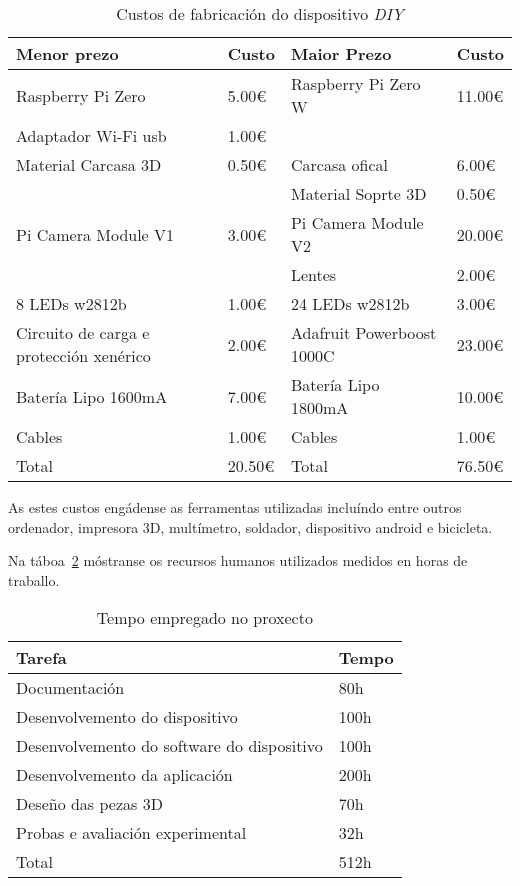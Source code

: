 \begin{table}[tbp]
    \label{tab:custos_dispositivo}
    \caption{Custos de fabricación do dispositivo \emph{DIY}}
    \begin{center}
        \begin{tabular}{|l|l||l|l|}
            \hline
             Menor prezo & Custo  & Maior Prezo & Custo \\ \hline
             Raspberry Pi Zero & 5.00€  & Raspberry Pi Zero W& 11.00€ \\ \hline
             Adaptador Wi-Fi usb & 1.00€ &  & \\ \hline
             Material Carcasa 3D & 0.50€ & Carcasa ofical & 6.00€ \\ \hline
              &  & Material Soprte 3D & 0.50€ \\ \hline
             Pi Camera Module V1 & 3.00€ & Pi Camera Module V2 & 20.00€ \\ \hline
              &  & Lentes  & 2.00€ \\ \hline
             8 LEDs w2812b & 1.00€  &  24 LEDs w2812b & 3.00€\\ \hline
             Circuito de carga e protección xenérico & 2.00€  & Adafruit Powerboost 1000C & 23.00€ \\ \hline
             Batería Lipo 1600mA & 7.00€ & Batería Lipo 1800mA & 10.00€\\ \hline
             Cables & 1.00€ &  Cables & 1.00€ \\ \hline
             Total & 20.50€ &  Total & 76.50€ \\ \hline
        \end{tabular}
    \end{center}
\end{table}

As estes custos engádense as ferramentas utilizadas incluíndo entre outros ordenador, impresora 3D, multímetro, soldador, dispositivo android e bicicleta.

Na táboa~\ref{tab:custos_humanos} móstranse os recursos humanos utilizados medidos en horas de traballo.

\begin{table}[tbp]
    \label{tab:custos_humanos}
    \caption{Tempo empregado no proxecto}
    \begin{center}
        \begin{tabular}{|l|l|}
            \hline
             Tarefa & Tempo\\ \hline
             Documentación & 80h \\ \hline
             Desenvolvemento do dispositivo & 100h \\ \hline
             Desenvolvemento do software do dispositivo & 100h \\ \hline
             Desenvolvemento da aplicación & 200h \\ \hline
             Deseño das pezas 3D & 70h \\ \hline
             Probas e avaliación experimental & 32h\\ \hline
             Total & 512h \\ \hline
        \end{tabular}
    \end{center}
\end{table}
